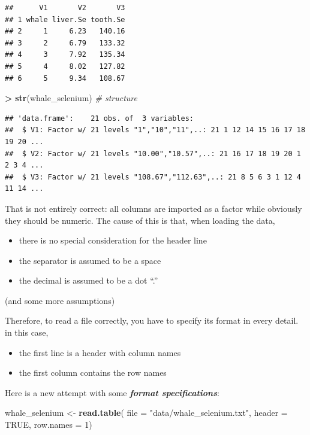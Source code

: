 \documentclass[]{book}
\newenvironment{Shaded}{\begin{snugshade}}{\end{snugshade}}
\newcommand{\CommentTok}[1]{\textcolor[rgb]{0.56,0.35,0.01}{\textit{#1}}}
\newcommand{\DataTypeTok}[1]{\textcolor[rgb]{0.13,0.29,0.53}{#1}}
\newcommand{\DecValTok}[1]{\textcolor[rgb]{0.00,0.00,0.81}{#1}}
\newcommand{\KeywordTok}[1]{\textcolor[rgb]{0.13,0.29,0.53}{\textbf{#1}}}
\newcommand{\NormalTok}[1]{#1}
\newcommand{\OperatorTok}[1]{\textcolor[rgb]{0.81,0.36,0.00}{\textbf{#1}}}
\newcommand{\OtherTok}[1]{\textcolor[rgb]{0.56,0.35,0.01}{#1}}
\newcommand{\StringTok}[1]{\textcolor[rgb]{0.31,0.60,0.02}{#1}}
\providecommand{\tightlist}{%
  \setlength{\itemsep}{0pt}\setlength{\parskip}{0pt}}
\begin{document}
\begin{verbatim}
##      V1       V2       V3
## 1 whale liver.Se tooth.Se
## 2     1     6.23   140.16
## 3     2     6.79   133.32
## 4     3     7.92   135.34
## 5     4     8.02   127.82
## 6     5     9.34   108.67
\end{verbatim}

\begin{Shaded}
\begin{Highlighting}[]
\OperatorTok{>}\StringTok{ }\KeywordTok{str}\NormalTok{(whale_selenium) }\CommentTok{# structure}
\end{Highlighting}
\end{Shaded}

\begin{verbatim}
## 'data.frame':    21 obs. of  3 variables:
##  $ V1: Factor w/ 21 levels "1","10","11",..: 21 1 12 14 15 16 17 18 19 20 ...
##  $ V2: Factor w/ 21 levels "10.00","10.57",..: 21 16 17 18 19 20 1 2 3 4 ...
##  $ V3: Factor w/ 21 levels "108.67","112.63",..: 21 8 5 6 3 1 12 4 11 14 ...
\end{verbatim}

That is not entirely correct: all columns are imported as a factor while obviously they should be numeric. The cause of this is that, when loading the data,

\begin{itemize}
\tightlist
\item
  there is no special consideration for the header line
\item
  the separator is assumed to be a space
\item
  the decimal is assumed to be a dot ``.''
\end{itemize}

(and some more assumptions)

Therefore, to read a file correctly, you have to specify its format in every detail. in this case,

\begin{itemize}
\tightlist
\item
  the first line is a header with column names
\item
  the first column contains the row names
\end{itemize}

Here is a new attempt with some \textbf{\emph{format specifications}}:

\begin{Shaded}
\begin{Highlighting}[]
\NormalTok{whale_selenium <-}\StringTok{ }\KeywordTok{read.table}\NormalTok{(}
    \DataTypeTok{file =} \StringTok{"data/whale_selenium.txt"}\NormalTok{,}
    \DataTypeTok{header =} \OtherTok{TRUE}\NormalTok{,}
    \DataTypeTok{row.names =} \DecValTok{1}\NormalTok{)}
\end{Highlighting}
\end{Shaded}
\end{document}
